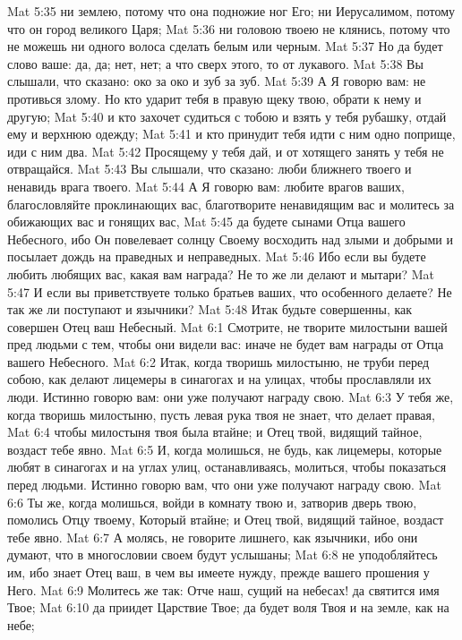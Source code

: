 Mat 5:35  ни землею, потому что она подножие ног Его; ни Иерусалимом, потому что он город великого Царя;
Mat 5:36  ни головою твоею не клянись, потому что не можешь ни одного волоса сделать белым или черным.
Mat 5:37  Но да будет слово ваше: да, да; нет, нет; а что сверх этого, то от лукавого.
Mat 5:38  Вы слышали, что сказано: око за око и зуб за зуб.
Mat 5:39  А Я говорю вам: не противься злому. Но кто ударит тебя в правую щеку твою, обрати к нему и другую;
Mat 5:40  и кто захочет судиться с тобою и взять у тебя рубашку, отдай ему и верхнюю одежду;
Mat 5:41  и кто принудит тебя идти с ним одно поприще, иди с ним два.
Mat 5:42  Просящему у тебя дай, и от хотящего занять у тебя не отвращайся.
Mat 5:43  Вы слышали, что сказано: люби ближнего твоего и ненавидь врага твоего.
Mat 5:44  А Я говорю вам: любите врагов ваших, благословляйте проклинающих вас, благотворите ненавидящим вас и молитесь за обижающих вас и гонящих вас,
Mat 5:45  да будете сынами Отца вашего Небесного, ибо Он повелевает солнцу Своему восходить над злыми и добрыми и посылает дождь на праведных и неправедных.
Mat 5:46  Ибо если вы будете любить любящих вас, какая вам награда? Не то же ли делают и мытари?
Mat 5:47  И если вы приветствуете только братьев ваших, что особенного делаете? Не так же ли поступают и язычники?
Mat 5:48  Итак будьте совершенны, как совершен Отец ваш Небесный.
Mat 6:1  Смотрите, не творите милостыни вашей пред людьми с тем, чтобы они видели вас: иначе не будет вам награды от Отца вашего Небесного.
Mat 6:2  Итак, когда творишь милостыню, не труби перед собою, как делают лицемеры в синагогах и на улицах, чтобы прославляли их люди. Истинно говорю вам: они уже получают награду свою.
Mat 6:3  У тебя же, когда творишь милостыню, пусть левая рука твоя не знает, что делает правая,
Mat 6:4  чтобы милостыня твоя была втайне; и Отец твой, видящий тайное, воздаст тебе явно.
Mat 6:5  И, когда молишься, не будь, как лицемеры, которые любят в синагогах и на углах улиц, останавливаясь, молиться, чтобы показаться перед людьми. Истинно говорю вам, что они уже получают награду свою.
Mat 6:6  Ты же, когда молишься, войди в комнату твою и, затворив дверь твою, помолись Отцу твоему, Который втайне; и Отец твой, видящий тайное, воздаст тебе явно.
Mat 6:7  А молясь, не говорите лишнего, как язычники, ибо они думают, что в многословии своем будут услышаны;
Mat 6:8  не уподобляйтесь им, ибо знает Отец ваш, в чем вы имеете нужду, прежде вашего прошения у Него.
Mat 6:9  Молитесь же так: Отче наш, сущий на небесах! да святится имя Твое;
Mat 6:10  да приидет Царствие Твое; да будет воля Твоя и на земле, как на небе;
